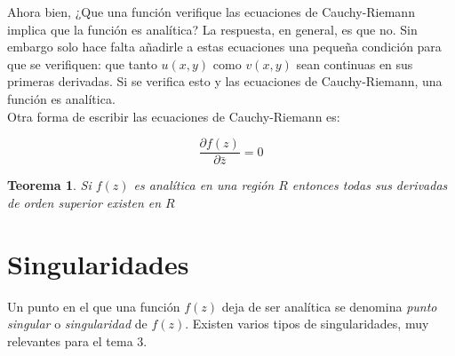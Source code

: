 \documentclass[12pt]{book}
\newcommand{\parciales}[2]{\frac{\partial #1}{\partial #2}}
\newtheorem{theorem}{Teorema}[section]
\begin{document}
Ahora bien, ¿Que una función verifique las ecuaciones de Cauchy-Riemann implica  que la función es analítica? La respuesta, en general, es que no. Sin embargo solo hace falta añadirle a estas ecuaciones una pequeña condición para que se verifiquen: que tanto $u(x,y)$ como $v(x,y)$ sean continuas en sus primeras derivadas. Si se verifica esto y las ecuaciones de Cauchy-Riemann, una función es analítica. \\

Otra forma de escribir las ecuaciones de Cauchy-Riemann es:

\begin{equation}
\parciales{f(z)}{\bar{z}}=0
\end{equation}

\begin{theorem}
Si $f(z)$ es analítica en una región $R$ entonces todas sus derivadas de orden superior existen en $R$
\end{theorem}


\section{Singularidades}

Un punto en el que una función $f(z)$ deja de ser analítica se denomina \textit{punto singular} o \textit{singularidad} de $f(z)$. Existen varios tipos de singularidades, muy relevantes para el tema 3.
\end{document}
